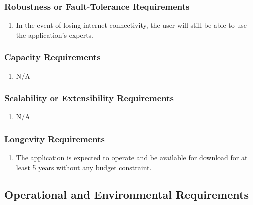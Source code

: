 \documentclass[titlepage]{article}
\begin{document}
\subsubsection{Robustness or Fault-Tolerance Requirements}
\label{ssub:robustness_or_fault_tolerance_requirements}
\begin{enumerate}[{PR}1. ]
	\item In the event of losing internet connectivity, the user will still be able to use the application's experts. 
\end{enumerate}

\subsubsection{Capacity Requirements}
\label{ssub:capacity_requirements}
\begin{enumerate}[{PR}1. ]
	\item N/A
\end{enumerate}

\subsubsection{Scalability or Extensibility Requirements}
\label{ssub:scalability_or_extensibility_requirements}
\begin{enumerate}[{PR}1. ]
	\item N/A
\end{enumerate}

\subsubsection{Longevity Requirements}
\label{ssub:longevity_requirements}
\begin{enumerate}[{PR}1. ]
	\item The application is expected to operate and be available for download for at least 5 years without any budget constraint. 
\end{enumerate}


\subsection{Operational and Environmental Requirements}
\label{sub:operational_and_environmental_requirements}
\end{document}
